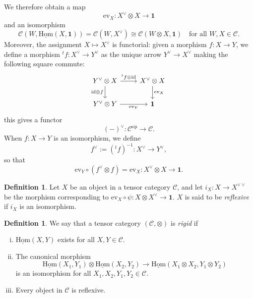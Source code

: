\documentclass[10pt]{amsart}
\numberwithin{equation}{section}
\def\~#1{\mathscr{#1}}
\newcommand{\id}{\mathrm{id}}
\newcommand{\op}{\mathrm{op}}
\newcommand{\ev}{\mathrm{ev}}
\newcommand{\Hom}{\mathrm{Hom}}
\newcommand{\iHom}{\underline{\Hom}}
\theoremstyle{plain}
\theoremstyle{definition}
\newtheorem{defn}[thm]{Definition}
\theoremstyle{remark}
\begin{document}
We therefore obtain a map
\[\ev_X : X^\vee \otimes X \to \mathbf{1}\]
and an isomorphism
\begin{equation}
    \~C(W, \iHom(X, \mathbf{1})) = \~C(W, X^\vee) \cong \~C(W \otimes X, \mathbf{1}) \quad \text{for all } W, X \in \~C.
\end{equation}
Moreover, the assignment $X \mapsto X^\vee$ is functorial: given a morphism $f: X \to Y$, we define a morphism $^{t}f: X^\vee \to Y^\vee$ as the unique arrow $Y^\vee \to X^\vee$ making the following square commute:
\[\begin{tikzcd}
    {Y^\vee \otimes X} & {X^\vee \otimes X} \\
    {Y^\vee \otimes Y} & {\mathbf{1}}
    \arrow["{^{t}f \otimes \id}", from=1-1, to=1-2]
    \arrow["{\id \otimes f}"', from=1-1, to=2-1]
    \arrow["{\ev_X}", from=1-2, to=2-2]
    \arrow["{\ev_Y}"', from=2-1, to=2-2]
\end{tikzcd}\]
this gives a functor
\[(-)^\vee: \~C^\op \to \~C.\]
When $f: X \to Y$ is an isomorphism, we define 
\[f^\vee:=  (^{t}f)^{-1}: X^\vee \to Y^\vee,\]
so that
\[\ev_Y \circ (f^\vee \otimes f) = \ev_X: X^\vee \otimes X \to \mathbf{1}.\]
\begin{defn}
    Let $X$ be an object in a tensor category $\~C$, and let $i_X: X \to X^{\vee \vee}$ be the morphism corresponding to $\ev_X \circ \psi: X \otimes X^\vee \to \mathbf{1}$. $X$ is said to be \emph{reflexive} if $i_X$ is an isomorphism.
\end{defn}

\begin{defn}
    We say that a tensor category $(\~C, \otimes)$ is \emph{rigid} if 
    \begin{enumerate}[(i)]  
        \item $\iHom(X, Y)$ exists for all $X, Y \in \~C$. 
        \item The canonical morphism
        \[\iHom(X_1, Y_1) \otimes \iHom(X_2, Y_2) \to \iHom(X_1 \otimes X_2, Y_1 \otimes Y_2)\]
        is an isomorphism for all $X_1, X_2, Y_1, Y_2 \in \~C$.
        \item Every object in $\~C$ is reflexive.
    \end{enumerate}
\end{defn}
\end{document}

